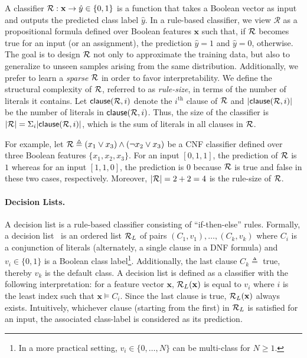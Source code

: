 A classifier $ {\mathcal{R}}: \mathbf{x} \rightarrow \hat{y} \in  \{0,1\} $ is a  function that takes a Boolean vector as input and outputs the predicted class label $\hat{y}$.  %
In a rule-based classifier, we view $ \mathcal{R} $ as a propositional formula defined over Boolean features $ \mathbf{x} $ such that, if $ {\mathcal{R}} $ becomes true for an input (or an assignment), the prediction $ \hat{y} = 1 $ and $ \hat{y} = 0 $, otherwise.  The goal is to design ${\mathcal{R}}$ not only to approximate the training data, but also to generalize to unseen samples arising from the same distribution. Additionally, we prefer to learn a \emph{sparse} $ {\mathcal{R}} $ in order to favor interpretability. We define the structural complexity of $ {\mathcal{R}} $, referred to as \emph{rule-size}, in terms of the number of literals it contains. Let $\mathsf{clause}({\mathcal{R}},i)$ denote  the  $i^\text{th}$ clause of ${\mathcal{R}}$ and $ |\mathsf{clause}({\mathcal{R}},i)| $ be  the number of literals in $\mathsf{clause}({\mathcal{R}},i)$. Thus, the size of the classifier is $|{\mathcal{R}}| =  \Sigma_i |\mathsf{clause}({\mathcal{R}},i)| $, which is the sum of literals in all clauses in $ {\mathcal{R}} $. 

For example, let $ {\mathcal{R}} \triangleq (x_1 \vee x_3) \wedge (\neg x_2 \vee x_3) $ be a CNF classifier defined over three Boolean features $ \{x_1, x_2, x_3\} $. For an input $ [0, 1, 1] $, the prediction of $ {\mathcal{R}}  $ is $ 1 $ whereas for an input $ [1, 1, 0] $, the prediction is $ 0 $ because $ {\mathcal{R}} $ is true and false in these two cases, respectively. Moreover, $ |{\mathcal{R}}| = 2 + 2 = 4 $ is the rule-size of $ {\mathcal{R}} $. 

\paragraph{Decision Lists.} A decision list is a rule-based classifier consisting of ``if-then-else'' rules. Formally, a decision list~\cite{rivest1987learning} is an ordered list $ {\mathcal{R}}_L $ of pairs $ (C_1, v_1), \dots, (C_k, v_k) $ where $ C_i $ is a conjunction of literals (alternately, a single clause in a DNF formula) and $ v_i \in \{0,1\} $ is  a Boolean class label\footnote{In a more practical setting, $ v_i \in \{0, \dots, N\} $  can be multi-class for $ N \ge 1 $.}. Additionally, the last clause $ C_k \triangleq  $ true, thereby $ v_k $ is the default class. A decision list is defined as a classifier with the following interpretation: for a feature vector $ \mathbf{x} $,  $ {\mathcal{R}}_L(\mathbf{x}) $ is equal to $ v_i $ where $ i $ is the least index such that $ \mathbf{x} \models C_i $. Since the last clause is true, $ {\mathcal{R}}_L(\mathbf{x}) $ always exists. Intuitively, whichever clause (starting from the first) in $ {\mathcal{R}}_L $ is satisfied for an input, the associated class-label is considered as its prediction.

